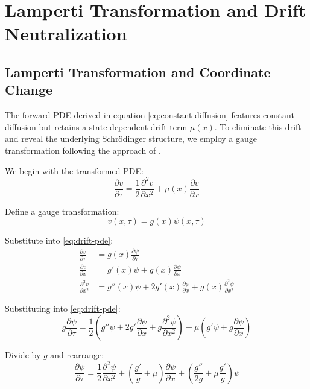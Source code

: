 \documentclass[a4paper,11pt]{article}
\begin{document}
\section{Lamperti Transformation and Drift Neutralization}

\subsection{Lamperti Transformation and Coordinate Change}

The forward PDE derived in equation \eqref{eq:constant-diffusion} features constant diffusion but retains a state-dependent drift term $\mu(x)$. To eliminate this drift and reveal the underlying Schrödinger structure, we employ a gauge transformation following the approach of \cite{Lamperti1962,MollerMadsen2010}.

We begin with the transformed PDE:
\begin{equation}
\frac{\partial v}{\partial \tau} = \frac{1}{2}\frac{\partial^2 v}{\partial x^2} + \mu(x)\frac{\partial v}{\partial x}
\label{eq:drift-pde}
\end{equation}

Define a gauge transformation:
\begin{equation}
v(x, \tau) = g(x) \psi(x, \tau)
\label{eq:gauge-transform}
\end{equation}

Substitute into \eqref{eq:drift-pde}:
\begin{align}
\frac{\partial v}{\partial \tau} &= g(x) \frac{\partial \psi}{\partial \tau} \\
\frac{\partial v}{\partial x} &= g'(x)\psi + g(x)\frac{\partial \psi}{\partial x} \\
\frac{\partial^2 v}{\partial x^2} &= g''(x)\psi + 2g'(x)\frac{\partial \psi}{\partial x} + g(x)\frac{\partial^2 \psi}{\partial x^2}
\end{align}

Substituting into \eqref{eq:drift-pde}:
\begin{equation}
g\frac{\partial \psi}{\partial \tau} = \frac{1}{2}\left(g''\psi + 2g'\frac{\partial \psi}{\partial x} + g\frac{\partial^2 \psi}{\partial x^2}\right) + \mu\left(g'\psi + g\frac{\partial \psi}{\partial x}\right)
\end{equation}

Divide by $g$ and rearrange:
\begin{equation}
\frac{\partial \psi}{\partial \tau} = \frac{1}{2}\frac{\partial^2 \psi}{\partial x^2} + \left(\frac{g'}{g} + \mu\right)\frac{\partial \psi}{\partial x} + \left(\frac{g''}{2g} + \mu\frac{g'}{g}\right)\psi
\end{equation}
\end{document}

